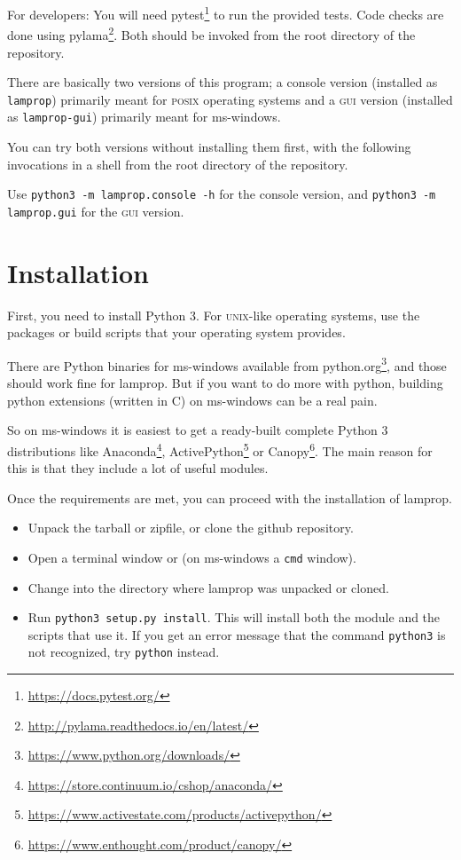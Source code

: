 \documentclass[a4paper,landscape,oneside,11pt,twocolumn]{memoir}
\begin{document}
For developers: You will need pytest\footnote{\url{https://docs.pytest.org/}}
to run the provided tests. Code checks are done using
pylama\footnote{\url{http://pylama.readthedocs.io/en/latest/}}. Both should be
invoked from the root directory of the repository.

There are basically two versions of this program; a console version (installed
as \texttt{lamprop}) primarily meant for \textsc{posix} operating systems and
a \textsc{gui} version (installed as \texttt{lamprop-gui}) primarily meant for
ms-windows.

You can try both versions without installing them first, with the following
invocations in a shell from the root directory of the repository.

Use \texttt{python3 -m lamprop.console -h} for the console version, and
\texttt{python3 -m lamprop.gui} for the \textsc{gui} version.

\section{Installation} %

First, you need to install Python 3. For \textsc{unix}-like operating systems,
use the packages or build scripts that your operating system provides.

There are Python binaries for ms-windows available from
python.org\footnote{\url{https://www.python.org/downloads/}}, and those should
work fine for lamprop. But if you want to do more with python, building python
extensions (written in C) on ms-windows can be a real pain.

So on ms-windows it is easiest to get a ready-built complete Python 3
distributions like Anaconda\footnote{\url{https://store.continuum.io/cshop/anaconda/}},
ActivePython\footnote{\url{https://www.activestate.com/products/activepython/}} or
Canopy\footnote{\url{https://www.enthought.com/product/canopy/}}. The main
reason for this is that they include a lot of useful modules.

Once the requirements are met, you can proceed with the installation of lamprop.

\begin{itemize}
    \item Unpack the tarball or zipfile, or clone the github repository.
    \item Open a terminal window or (on ms-windows a \texttt{cmd} window).
    \item Change into the directory where lamprop was unpacked or cloned.
    \item Run \texttt{python3 setup.py install}. This will install both the module and
        the scripts that use it. If you get an error message that the command
        \texttt{python3} is not recognized, try \texttt{python} instead.
\end{itemize}
\end{document}

